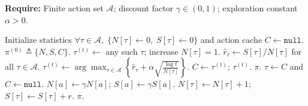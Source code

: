 \begin{algorithm}[t]
\caption{(Non-contextual case) Discounted UCB}
\label{alg:ducb}
\textbf{Require:} Finite action set $\mathcal A$; discount factor $\gamma\in(0,1)$; exploration constant $\alpha>0$.
\begin{algorithmic}[1]
    \State Initialize statistics $\forall{\tau\in\mathcal A},\;\{N[\tau]\gets 0,\; S[\tau]\gets 0\}$ and action cache $C\gets \texttt{null}$.
    \State \Return $\pi^{(0)} \triangleq \{N,S,C\}$.
\EndProcedure
{}
        \State $\tau^{(t)}\gets$ any such $\tau$; increase $N[\tau]=1$.
    \Else
        \State $\hat r_\tau\gets S[\tau]/N[\tau]$ for all $\tau\in\mathcal A$.
        \State $\tau^{(t)} \gets \arg\max_{\tau\in\mathcal A}\left\{\hat r_\tau+\alpha\sqrt{\frac{\log t}{N[\tau]}}\right\}$.
    \EndIf
    \State $C\gets \tau^{(t)}$; \Return $\tau^{(t)}$.
\EndProcedure
{}
     \State \Return $\pi$. \EndIf
    \State $\tau \gets C$ and $C\gets \texttt{null}$.
     \State $N[a]\gets \gamma N[a]$; \;\; $S[a]\gets \gamma S[a]$. \EndFor
    \State $N[\tau]\gets N[\tau]+1$; \;$S[\tau]\gets S[\tau]+r$.
    \State \Return $\pi$.
\EndProcedure
\end{algorithmic}
\end{algorithm}